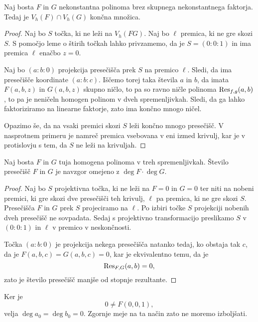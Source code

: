 \begin{trditev}
Naj bosta $F$ in $G$ nekonstantna polinoma brez skupnega
nekonstantnega faktorja. Tedaj je $V_h(F) \cap V_h(G)$ končna
množica.
\end{trditev}

\begin{proof}
Naj bo $S$ točka, ki ne leži na $V_h(FG)$. Naj bo $\ell$ premica,
ki ne gre skozi $S$. S pomočjo leme o štirih točkah lahko
privzamemo, da je $S = (0 : 0 : 1)$ in ima premica $\ell$ enačbo
$z = 0$.

Naj bo $(a : b : 0)$ projekcija presečišča prek $S$ na premico
$\ell$. Sledi, da ima presečišče koordinate $(a : b : c)$. Iščemo
torej taka števila $a$ in $b$, da imata $F(a, b, z)$ in
$G(a, b, z)$ skupno ničlo, to pa so ravno ničle polinoma
$\operatorname{Res}_{f,g}(a,b)$, to pa je neničeln homogen polinom v dveh
spremenljivkah. Sledi, da ga lahko faktoriziramo na linearne
faktorje, zato ima končno mnogo ničel.

Opazimo še, da na vsaki premici skozi $S$ leži končno mnogo
presečišč. V nasprotnem primeru je namreč premica vsebovana v eni
izmed krivulj, kar je v protislovju s tem, da $S$ ne leži na
krivuljah. 
\end{proof}


\begin{izrek}[Bezout]
Naj bosta $F$ in $G$ tuja homogena polinoma v treh spremenljivkah.
Število presečišč $F$ in $G$ je navzgor omejeno z
$\deg F \cdot \deg G$.
\end{izrek}

\begin{proof}
Naj bo $S$ projektivna točka, ki ne leži na $F = 0$ in $G = 0$ ter
niti na nobeni premici, ki gre skozi dve presečišči teh krivulj,
$\ell$ pa premica, ki ne gre skozi $S$. Presečišča $F$ in $G$ prek
$S$ projeciramo na $\ell$. Po izbiri točke $S$ projekciji nobenih
dveh presečišč ne sovpadata. Sedaj s projektivno transformacijo
preslikamo $S$ v $(0 : 0 : 1)$ in $\ell$ v premico v neskončnosti.

Točka $(a : b : 0)$ je projekcija nekega presečišča natanko tedaj,
ko obstaja tak $c$, da je $F(a, b, c) = G(a, b, c) = 0$, kar je
ekvivalentno temu, da je
\[
\operatorname{Res}_{F,G}(a, b) = 0,
\]
zato je število presečišč manjše od stopnje rezultante. 
\end{proof}

\begin{opomba}
Ker je
\[
0 \ne F(0, 0, 1),
\]
velja $\deg a_0 = \deg b_0 = 0$. Zgornje meje na ta način zato ne
moremo izboljšati.
\end{opomba}

